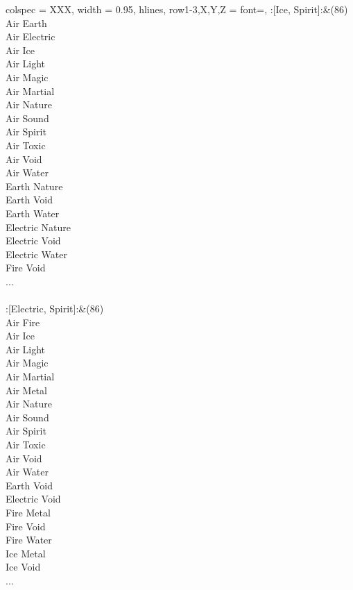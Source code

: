 \begin{longtblr}[
	caption = {2v2 Defending Weak},
	label = {2v2-Defending-Weak},
]{
	colspec = {XXX}, width = 0.95\linewidth,
	hlines,
	row{1-3,X,Y,Z} = {font=\bfseries},
}
	:[Ice, Spirit]:&{(86)\\
	Air Earth \\
	Air Electric \\
	Air Ice \\
	Air Light \\
	Air Magic \\
	Air Martial \\
	Air Nature \\
	Air Sound \\
	Air Spirit \\
	Air Toxic \\
	Air Void \\
	Air Water \\
	Earth Nature \\
	Earth Void \\
	Earth Water \\
	Electric Nature \\
	Electric Void \\
	Electric Water \\
	Fire Void \\
	...\\
	}\\

	:[Electric, Spirit]:&{(86)\\
	Air Fire \\
	Air Ice \\
	Air Light \\
	Air Magic \\
	Air Martial \\
	Air Metal \\
	Air Nature \\
	Air Sound \\
	Air Spirit \\
	Air Toxic \\
	Air Void \\
	Air Water \\
	Earth Void \\
	Electric Void \\
	Fire Metal \\
	Fire Void \\
	Fire Water \\
	Ice Metal \\
	Ice Void \\
	...\\
	}\\


\end{longtblr}
